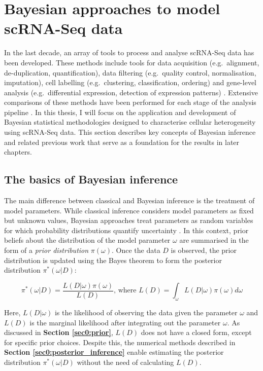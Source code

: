 
\section{Bayesian approaches to model scRNA-Seq data}

In the last decade, an array of tools to process and analyse scRNA-Seq data has been developed. 
These methods include tools for data acquisition (e.g.~alignment, de-duplication, quantification), data filtering (e.g.~quality control, normalisation, imputation), cell labelling (e.g.~clustering, classification, ordering) and gene-level analysis (e.g.~differential expression, detection of expression patterns) \citep{Zappia2018}. 
Extensive comparisons of these methods have been performed for each stage of the analysis pipeline \citep{Saelens2018, Soneson2018}. 
In this thesis, I will focus on the application and development of Bayesian statistical methodologies designed to characterise cellular heterogeneity using scRNA-Seq data. 
This section describes key concepts of Bayesian inference and related previous work that serve as a foundation for the results in later chapters.

\subsection{The basics of Bayesian inference}

The main difference between classical and Bayesian inference is the treatment of model parameters. 
While classical inference considers model parameters as fixed but unknown values, Bayesian approaches treat parameters as random variables for which probability distributions quantify uncertainty \citep{Bernardo2003}. 
In this context, prior beliefs about the distribution of the model parameter $\omega$ are summarised in the form of a \emph{prior distribution} $\pi(\omega)$. 
Once the data $D$ is observed, the prior distribution is updated using the Bayes theorem \cite{Bayes1763} to form the posterior distribution $\pi^*(\omega|D)$:

\begin{equation} \label{eq0:Bayes_theorem}
\pi^*(\omega|D)=\frac{L(D|\omega)\pi(\omega)}{L(D)}\text{, where }L(D)=\int_\omega{}L(D|\omega)\pi(\omega)d\omega 
\end{equation}

Here, $L(D|\omega)$ is the likelihood of observing the data given the parameter $\omega$ and $L(D)$ is the marginal likelihood after integrating out the parameter $\omega$. 
As discussed in \textbf{Section \ref{sec0:prior}}, $L(D)$ does not have a closed form, except for specific prior choices. 
Despite this, the numerical methods described in \textbf{Section \ref{sec0:posterior_inference}} enable estimating the posterior distribution $\pi^*(\omega|D)$ without the need of calculating $L(D)$.


